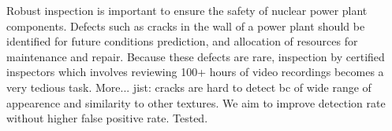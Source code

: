 Robust inspection is important to ensure the safety of nuclear power plant components. Defects such as cracks in the wall of a power plant should be identified for future conditions prediction, and allocation of resources for maintenance and repair. Because these defects are rare, inspection by certified inspectors which involves reviewing 100+ hours of video recordings becomes a very tedious task. More... jist: cracks are hard to detect bc of wide range of appearence and similarity to other textures. We aim to improve detection rate without higher false positive rate. Tested. 